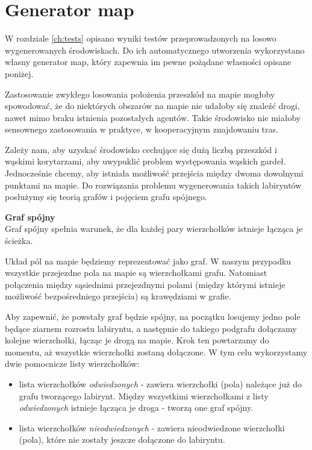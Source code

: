 \section{Generator map}
\label{ch:mazegen}

W rozdziale \ref{ch:tests} opisano wyniki testów przeprowadzonych na losowo wygenerowanych środowiskach.
Do ich automatycznego utworzenia wykorzystano własny generator map, który zapewnia im pewne pożądane własności opisane poniżej.

Zastosowanie zwykłego losowania położenia przeszkód na mapie mogłoby spowodować, że do niektórych obszarów na mapie nie udałoby się znaleźć drogi, nawet mimo braku istnienia pozostałych agentów. Takie środowisko nie miałoby sensownego zastosowania w praktyce, w kooperacyjnym znajdowaniu tras.

Zależy nam, aby uzyskać środowisko cechujące się dużą liczbą przeszkód i wąskimi korytarzami, aby uwypuklić problem występowania wąskich gardeł. Jednocześnie chcemy, aby istniała możliwość przejścia między dwoma dowolnymi punktami na mapie.
Do rozwiązania problemu wygenerowania takich labiryntów posłużymy się teorią grafów i pojęciem grafu spójnego.

\begin{definition}{\bf Graf spójny\\}
	Graf spójny spełnia warunek, że dla każdej pary wierzchołków istnieje łącząca je ścieżka.
\end{definition}

Układ pól na mapie będziemy reprezentować jako graf.
W naszym przypadku wszystkie przejezdne pola na mapie są wierzchołkami grafu. Natomiast połączenia między sąsiednimi przejezdnymi polami (między którymi istnieje możliwość bezpośredniego przejścia) są krawędziami w grafie.

Aby zapewnić, że powstały graf będzie spójny, na początku losujemy jedno pole będące ziarnem rozrostu labiryntu, a następnie do takiego podgrafu dołączamy kolejne wierzchołki, łącząc je drogą na mapie. Krok ten powtarzamy do momentu, aż wszystkie wierzchołki zostaną dołączone.
W tym celu wykorzystamy dwie pomocnicze listy wierzchołków:
\begin{itemize}
	\item lista wierzchołków {\it odwiedzonych} - zawiera wierzchołki (pola) należące już do grafu tworzącego labirynt. Między wszystkimi wierzchołkami z listy {\it odwiedzonych} istnieje łącząca je droga - tworzą one graf spójny.
	\item lista wierzchołków {\it nieodwiedzonych} - zawiera nieodwiedzone wierzchołki (pola), które nie zostały jeszcze dołączone do labiryntu.
\end{itemize}

